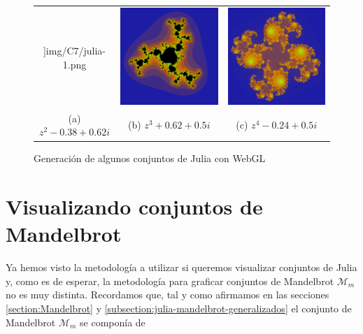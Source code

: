 \begin{figure}[ht]
\begin{tabular}{ccc}
]{img/C7/julia-1.png} &   \includegraphics[scale=0.2]{img/C7/julia-2.png} &   \includegraphics[scale=0.2]{img/C7/julia-3.png} \\
    (a) $z^2-0.38+0.62i$ & (b) $z^3+0.62+0.5i$ & (c) $z^4-0.24+0.5i$ \\[6pt]
    \end{tabular}
    \caption{Generación de algunos conjuntos de Julia con WebGL}
    \label{fig:julia-webgl}
\end{figure}

\section{Visualizando conjuntos de Mandelbrot}

Ya hemos visto la metodología a utilizar si queremos visualizar conjuntos de Julia y, como es de esperar, la metodología para graficar conjuntos de Mandelbrot $\mathcal{M}_m$ no es muy distinta. Recordamos que, tal y como afirmamos en las secciones \ref{section:Mandelbrot} y \ref{subsection:julia-mandelbrot-generalizados} el conjunto de Mandelbrot $\mathcal{M}_m$ se componía de